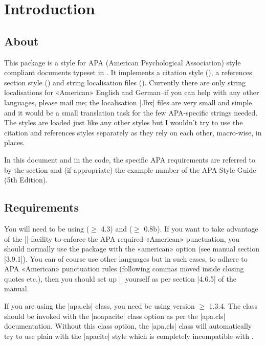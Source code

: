 \documentclass{ltxdockit}
\begin{document}
\printtitlepage
\tableofcontents

\section{Introduction}
\label{int}

\subsection{About}

This package is a  style for APA (American Psychological
Association) style compliant documents typeset in \latex. It implements a
citation style (), a references section style
() and string localisation files ().
Currently there are only string localisations for «American» English and
German--if you can help with any other languages, please mail me; the
localisation |.lbx| files are very small and simple and it would be a small
translation task for the few APA-specific strings needed.
The styles are loaded just like any other  styles but I
wouldn't try to use the citation and references styles separately as they
rely on each other, macro-wise, in places.

In this document and in the code, the specific APA requirements are
referred to by the section and (if appropriate) the example number of the
APA Style Guide (5th Edition).

\subsection{Requirements}\label{ref:req}

You will need to be using  ($\geq$ 4.3) and 
($\geq$ 0.8b). If you want to take advantage of the 
|\DeclareQuotePunctuation| facility to enforce the APA required «American»
punctuation, you should normally use the  package with the «american»
option (see  manual section |3.9.1|). You can of course use
other languages but in such cases, to adhere to APA «American» punctuation
rules (following commas moved inside closing quotes etc.), then you should
set up |\DeclareQuotePunctuation| yourself as per section |4.6.5| of the
 manual.

If you are using the |apa.cls| \latex class, you need be using version
$\geq$ 1.3.4. The class should be invoked with the |noapacite| class option
as per the |apa.cls| documentation. Without this class option, the
|apa.cls| class will automatically try to use plain \bibtex with the
|apacite| style which is completely incompatible with .
\end{document}
